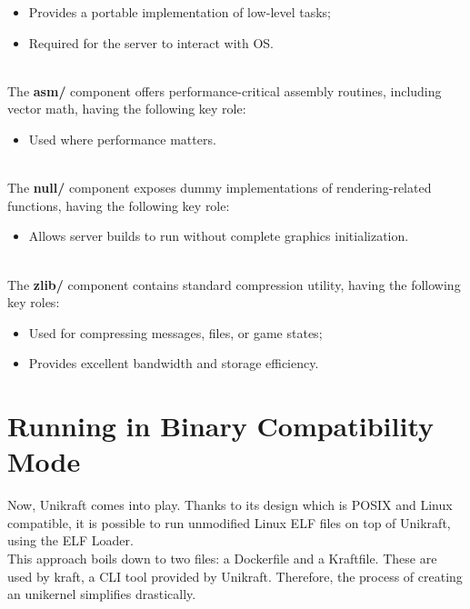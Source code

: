 \begin{itemize}
    \item Provides a portable implementation of low-level tasks;
    \item Required for the server to interact with OS.
\end{itemize} \\
The \textbf{asm/} component offers performance-critical assembly routines, including vector math, having the following key role:
\begin{itemize}
    \item Used where performance matters.
\end{itemize} \\
The \textbf{null/} component exposes dummy implementations of rendering-related functions, having the following key role:
\begin{itemize}
    \item Allows server builds to run without complete graphics initialization.
\end{itemize} \\
The \textbf{zlib/} component contains standard compression utility, having the following key roles:
\begin{itemize}
    \item Used for compressing messages, files, or game states;
    \item Provides excellent bandwidth and storage efficiency. \\
\end{itemize}
\newpage
\section{Running in Binary Compatibility Mode}
Now, Unikraft comes into play. Thanks to its design which is POSIX and Linux compatible, it is possible to run unmodified Linux ELF files on top of Unikraft, using the ELF Loader\cite{unikraft-app-elfloader}. \\
This approach boils down to two files: a Dockerfile and a Kraftfile. These are used by kraft\cite{unikraft-cli}, a CLI tool
provided by Unikraft. Therefore, the process of creating an unikernel simplifies drastically.

